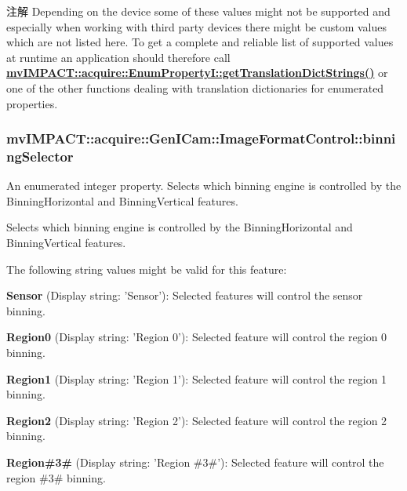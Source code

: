 \begin{DoxyNote}{注解}
Depending on the device some of these values might not be supported and especially when working with third party devices there might be custom values which are not listed here. To get a complete and reliable list of supported values at runtime an application should therefore call {\bfseries \hyperlink{classmv_i_m_p_a_c_t_1_1acquire_1_1_enum_property_i_a0ba6ccbf5ee69784d5d0b537924d26b6}{mv\+I\+M\+P\+A\+C\+T\+::acquire\+::\+Enum\+Property\+I\+::get\+Translation\+Dict\+Strings()}} or one of the other functions dealing with translation dictionaries for enumerated properties. 
\end{DoxyNote}
\hypertarget{classmv_i_m_p_a_c_t_1_1acquire_1_1_gen_i_cam_1_1_image_format_control_abc9a8da47925016f49531ccc884fcf8a}{
\subsubsection[{binning\+Selector}]{ mv\+I\+M\+P\+A\+C\+T\+::acquire\+::\+Gen\+I\+Cam\+::\+Image\+Format\+Control\+::binning\+Selector}}\label{classmv_i_m_p_a_c_t_1_1acquire_1_1_gen_i_cam_1_1_image_format_control_abc9a8da47925016f49531ccc884fcf8a}


An enumerated integer property. Selects which binning engine is controlled by the Binning\+Horizontal and Binning\+Vertical features. 

Selects which binning engine is controlled by the Binning\+Horizontal and Binning\+Vertical features.

The following string values might be valid for this feature\+:
\begin{DoxyItemize}
\item {\bfseries Sensor} (Display string\+: 'Sensor')\+: Selected features will control the sensor binning.
\item {\bfseries Region0} (Display string\+: 'Region 0')\+: Selected feature will control the region 0 binning.
\item {\bfseries Region1} (Display string\+: 'Region 1')\+: Selected feature will control the region 1 binning.
\item {\bfseries Region2} (Display string\+: 'Region 2')\+: Selected feature will control the region 2 binning.
\item {\bfseries Region\#3\#} (Display string\+: 'Region \#3\#')\+: Selected feature will control the region \#3\# binning.
\end{DoxyItemize}

